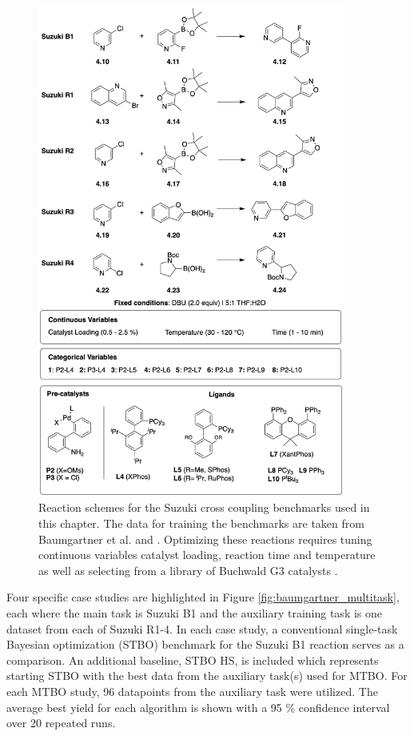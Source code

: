 \begin{figure}
    \centering
    \includegraphics[width=0.9\textwidth]{gfx/Chapter04/suzuki_benchmarks_thesis.png}
    \caption{Reaction schemes for the Suzuki cross coupling benchmarks used in this chapter. The data for training the benchmarks are taken from Baumgartner et al. \cite{Baumgartner2018} and \cite{Reizman2016b}. Optimizing these reactions requires tuning continuous variables catalyst loading, reaction time and temperature as well as selecting from a library of Buchwald G3 catalysts \cite{Bruno2013}.}
    \label{fig:benchmarks_suzuki}
\end{figure}

Four specific case studies are highlighted in Figure \ref{fig:baumgartner_multitask}, each where the main task is Suzuki B1 and the auxiliary training task is one dataset from each of Suzuki R1-4. In each case study, a conventional single-task Bayesian optimization (STBO) benchmark for the Suzuki B1 reaction serves as a comparison.  An additional baseline, STBO HS, is included which represents starting STBO with the best data from the auxiliary task(s) used for MTBO. For each MTBO study, 96 datapoints from the auxiliary task were utilized. The average best yield for each algorithm is shown with a 95 \% confidence interval over 20 repeated runs. 

